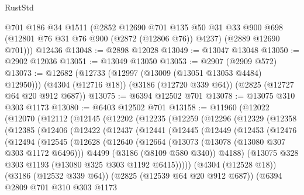\begin{lexlean}{RustStd}
\begin{coremodule}
      @701
      @186
      @34
      @1511
      (@2852
        @12690
        @701
        @135
        @50
        @31
        @33
        @900
        @698
        (@12801 @76 @31 @76 @900 (@2872 (@12806 @76)) @4237)
        (@2889 @12690 @701)))
    @12436
@13048 := @2898 @12028
@13049 := @13047 @13048
@13050 := @2902 @12036
@13051 := @13049 @13050
@13053 := @2907 (@2909 @572)
@13073 := @12682
    (@12733 (@12997 (@13009 (@13051 @13053 @4484) @12950)))
    (@4304 (@12716 @18))
    (@3186 (@12720 @339 @64))
    (@2825 (@12727 @64 @20 @912 @687))
@13075 := @6394 @12502 @701
@13078 := @13075 @310 @303 @1173
@13080 := @6403 @12502 @701
@13158 := @11960
    (@12022
      (@12070
        (@12112
          (@12145
            (@12202
              (@12235
                (@12259
                  (@12296
                    (@12329
                      (@12358
                        (@12385
                          (@12406
                            (@12422
                              (@12437
                                (@12441
                                  (@12445
                                    (@12449
                                      (@12453
                                        (@12476
                                          (@12494
                                            (@12545
                                              (@12628
                                                (@12640
                                                  (@12664
                                                    (@13073 (@13078 (@13080 @307 @303 @1172 @6496)))
                                                    @4499
                                                    (@3186 (@8109 @580 @340))
                                                    @4188)
                                                  (@13075
                                                    @328
                                                    @303
                                                    @1193
                                                    (@13080 @325 @303 @1192 @6415)))))
                                            (@4304 (@12528 @18))
                                            (@3186 (@12532 @339 @64))
                                            (@2825 (@12539 @64 @20 @912 @687))
                                            (@6394
                                              @2809
                                              @701
                                              @310
                                              @303
                                              @1173

\end{coremodule}
\end{lexlean}
